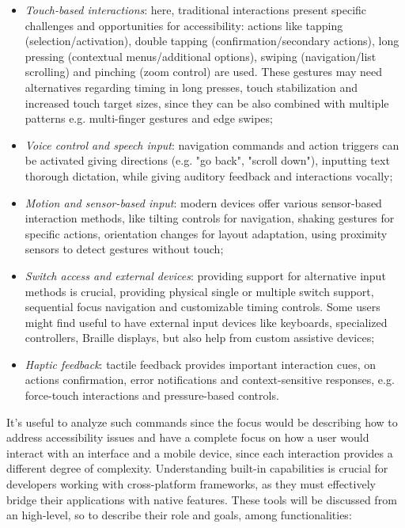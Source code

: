\begin{itemize}
    \item \textit{Touch-based interactions}: here, traditional interactions present specific challenges and opportunities for accessibility: actions like tapping (selection/activation), double tapping (confirmation/secondary actions), long pressing (contextual menus/additional options), swiping (navigation/list scrolling) and pinching (zoom control) are used. These gestures may need alternatives regarding timing in long presses, touch stabilization and increased touch target sizes, since they can be also combined with multiple patterns e.g. multi-finger gestures and edge swipes;
    
    \item \textit{Voice control and speech input}: navigation commands and action triggers can be activated giving directions (e.g. "go back", "scroll down"), inputting text thorough dictation, while giving auditory feedback and interactions vocally;
    
    \item \textit{Motion and sensor-based input}: modern devices offer various sensor-based interaction methods, like tilting controls for navigation, shaking gestures for specific actions, orientation changes for layout adaptation, using proximity sensors to detect gestures without touch;
    
    \item \textit{Switch access and external devices}: providing support for alternative input methods is crucial, providing physical single or multiple switch support, sequential focus navigation and customizable timing controls. Some users might find useful to have external input devices like keyboards, specialized controllers, Braille displays, but also help from custom assistive devices;
    
    \item \textit{Haptic feedback}: tactile feedback provides important interaction cues, on actions confirmation, error notifications and context-sensitive responses, e.g. force-touch interactions and pressure-based controls.
\end{itemize}

It's useful to analyze such commands since the focus would be describing how to address accessibility issues and have a complete focus on how a user would interact with an interface and a mobile device, since each interaction provides a different degree of complexity. Understanding built-in capabilities is crucial for developers working with cross-platform frameworks, as they must effectively bridge their applications with native features. These tools will be discussed from an high-level, so to describe their role and goals, among functionalities:

